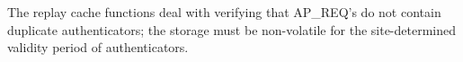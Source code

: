 The replay cache functions deal with verifying that AP_REQ's do not
contain duplicate authenticators; the storage must be non-volatile for
the site-determined validity period of authenticators.

